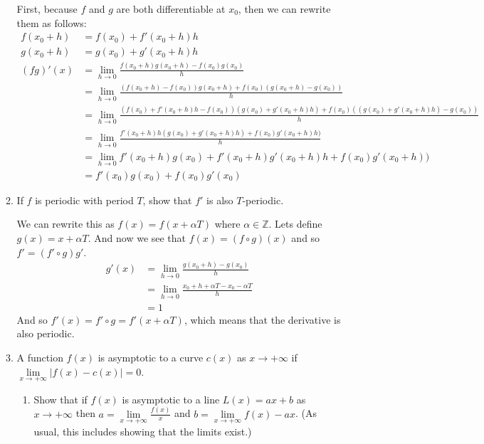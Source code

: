 \documentclass[letterpaper]{article}
\begin{document}
\begin{enumerate}
\begin{enumerate}
  First, because $f$ and $g$ are both differentiable at $x_0$, then we can rewrite them as follows:
  \begin{align*}
    f(x_0+h)&=f(x_0)+f'(x_0+h)h\\
    g(x_0+h)&=g(x_0)+g'(x_0+h)h\\
    (fg)'(x)&=\lim_{h\to 0}\frac{f(x_0+h)g(x_0+h)-f(x_0)g(x_0)}{h}\\
    &=\lim_{h\to0}\frac{(f(x_0+h)-f(x_0))g(x_0+h)+f(x_0)(g(x_0+h)-g(x_0))}{h}\\
    &=\lim_{h\to0}\frac{(f(x_0)+f'(x_0+h)h-f(x_0))(g(x_0)+g'(x_0+h)h)+f(x_0)((g(x_0)+g'(x_0+h)h)-g(x_0))}{h}\\
    &=\lim_{h\to0}\frac{f'(x_0+h)h(g(x_0)+g'(x_0+h)h)+f(x_0)g'(x_0+h)h)}{h}\\
    &=\lim_{h\to0}f'(x_0+h)g(x_0)+f'(x_0+h)g'(x_0+h)h+f(x_0)g'(x_0+h))\\
    &=f'(x_0)g(x_0)+f(x_0)g'(x_0)
  \end{align*}
  \setcounter{enumii}{13}
  \item
  If $f$ is periodic with period $T$, show that $f'$ is also $T$-periodic.

  We can rewrite this as $f(x)=f(x+\alpha T)$ where $\alpha\in\mathbb{Z}$. Lets define $g(x)=x+\alpha T$. And now we see that $f(x)=(f\circ g)(x)$ and so $f'=(f'\circ g)g'$.
  \begin{align*}
    g'(x)&=\lim\limits_{h\to0}\frac{g(x_0+h)-g(x_0)}{h}\\
    &=\lim\limits_{h\to0}\frac{x_0+h+\alpha T-x_0-\alpha  T}{h}\\
    &=1
  \end{align*}
  And so $f'(x)=f'\circ g=f'(x +\alpha T)$, which means that the derivative is also  periodic.
  \item
  A function $f(x)$ is asymptotic to a curve $c(x)$ as $x\to+\infty$ if $\lim\limits_{x\to+\infty}|f(x)-c(x)|=0$.
    \begin{enumerate}
    \item
    Show that if $f(x)$ is asymptotic to a line $L(x)=ax+b$ as $x\to+\infty$ then $a=\lim\limits_{x\to+\infty}\frac{f(x)}{x}$ and $b=\lim\limits_{x\to+\infty}f(x)-ax$. (As usual, this includes showing that the limits exist.)


\end{enumerate}
\end{enumerate}
\end{enumerate}
\end{document}

